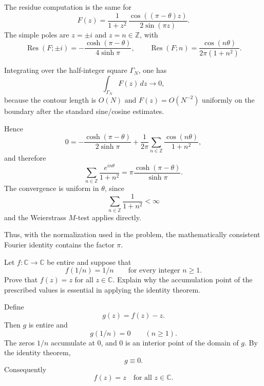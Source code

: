 

\begin{solution}
The residue computation is the same for
\[
F(z)=\frac{1}{1+z^2}\,
\frac{\cos((\pi-\theta)z)}{2\sin(\pi z)}.
\]
The simple poles are \(z=\pm i\) and \(z=n\in\mathbb Z\), with
\[
\operatorname{Res}(F;\pm i)
=
-\frac{\cosh(\pi-\theta)}{4\sinh\pi},
\qquad
\operatorname{Res}(F;n)
=
\frac{\cos(n\theta)}{2\pi(1+n^2)}.
\]

Integrating over the half-integer square \(\Gamma_N\), one has
\[
\int_{\Gamma_N}F(z)\,dz\longrightarrow0,
\]
because the contour length is \(O(N)\) and \(F(z)=O(N^{-2})\) uniformly on the boundary after the standard sine/cosine estimates.

Hence
\[
0
=
-\frac{\cosh(\pi-\theta)}{2\sinh\pi}
+
\frac{1}{2\pi}
\sum_{n\in\mathbb Z}\frac{\cos(n\theta)}{1+n^2},
\]
and therefore
\[
\boxed{
\sum_{n\in\mathbb Z}\frac{e^{in\theta}}{1+n^2}
=
\pi\frac{\cosh(\pi-\theta)}{\sinh\pi}.
}
\]
The convergence is uniform in \(\theta\), since
\[
\sum_{n\in\mathbb Z}\frac1{1+n^2}<\infty
\]
and the Weierstrass \(M\)-test applies directly.

Thus, with the normalization used in the problem, the mathematically consistent Fourier identity contains the factor \(\pi\).
\end{solution}


\begin{problem}[CP-IV-0062]
\label{prob:cp-iv-0062}
Let $f:\mathbb C\to\mathbb C$ be entire and suppose that
\[
f(1/n)=1/n\qquad\text{for every integer }n\ge1.
\]
Prove that $f(z)=z$ for all $z\in\mathbb C$.
Explain why the accumulation point of the prescribed values is essential in
applying the identity theorem.
\end{problem}

\begin{solution}
Define
\[
g(z)=f(z)-z.
\]
Then \(g\) is entire and
\[
g(1/n)=0
\qquad (n\ge1).
\]
The zeros \(1/n\) accumulate at \(0\), and \(0\) is an interior point of the domain of \(g\). By the identity theorem,
\[
g\equiv0.
\]
Consequently
\[
\boxed{f(z)=z\quad\text{for all }z\in\mathbb C.}
\]
\end{solution}


